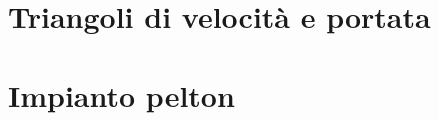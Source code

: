 \documentclass[a4paper, 15pt]{article}
\begin{document}
\section{Triangoli di velocità e portata}
%	

\section{Impianto pelton}
\end{document}
